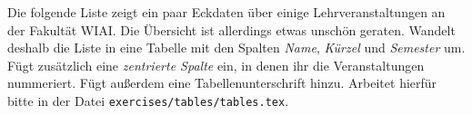 Die folgende Liste zeigt ein paar Eckdaten über einige Lehrveranstaltungen an der Fakultät WIAI. Die Übersicht ist allerdings etwas unschön geraten. Wandelt deshalb die Liste in eine Tabelle mit den Spalten \emph{Name}, \emph{Kürzel} und \emph{Semester} um. Fügt zusätzlich eine \emph{zentrierte Spalte} ein, in denen ihr die Veranstaltungen nummeriert. Fügt außerdem eine Tabellenunterschrift hinzu. Arbeitet hierfür bitte in der Datei \texttt{exercises/tables/tables.tex}.



